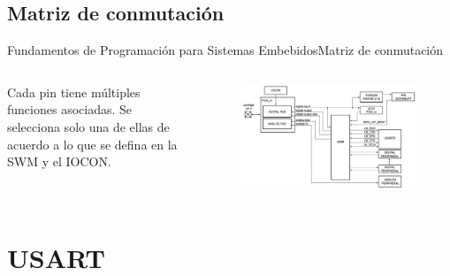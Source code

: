 \documentclass[aspectratio=169, xcolor=dvipsnames]{beamer}
\begin{document}
\subsection{Matriz de conmutación}
\begin{frame}{Fundamentos de Programación para Sistemas Embebidos}{Matriz de conmutación}
\begin{columns}
\begin{column}{0.3\textwidth}
Cada pin tiene múltiples funciones asociadas. Se selecciona solo una de ellas de acuerdo a lo que se defina en la SWM y el IOCON.
\end{column}
\begin{column}{0.7\textwidth}
\begin{figure}
\centering
\includegraphics[width=0.75\linewidth]{resources/images/swm.png}
\end{figure}
\end{column}
\end{columns}
\end{frame}

\section{USART}
\end{document}
